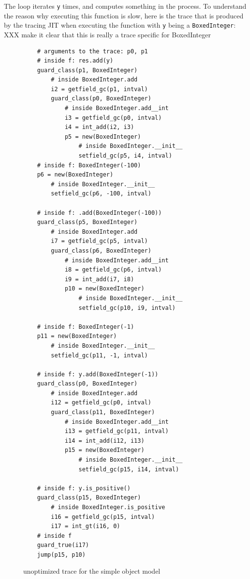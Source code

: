 \documentclass{sigplanconf}
\begin{document}
The loop iterates \texttt{y} times, and computes something in the process. To
understand the reason why executing this function is slow, here is the trace
that is produced by the tracing JIT when executing the function with \texttt{y}
being a \texttt{BoxedInteger}: XXX make it clear that this is really a trace specific for BoxedInteger

\begin{figure}
\begin{verbatim}
    # arguments to the trace: p0, p1
    # inside f: res.add(y)
    guard_class(p1, BoxedInteger)
        # inside BoxedInteger.add
        i2 = getfield_gc(p1, intval)
        guard_class(p0, BoxedInteger)
            # inside BoxedInteger.add__int
            i3 = getfield_gc(p0, intval)
            i4 = int_add(i2, i3)
            p5 = new(BoxedInteger)
                # inside BoxedInteger.__init__
                setfield_gc(p5, i4, intval)
    # inside f: BoxedInteger(-100) 
    p6 = new(BoxedInteger)
        # inside BoxedInteger.__init__
        setfield_gc(p6, -100, intval)

    # inside f: .add(BoxedInteger(-100))
    guard_class(p5, BoxedInteger)
        # inside BoxedInteger.add
        i7 = getfield_gc(p5, intval)
        guard_class(p6, BoxedInteger)
            # inside BoxedInteger.add__int
            i8 = getfield_gc(p6, intval)
            i9 = int_add(i7, i8)
            p10 = new(BoxedInteger)
                # inside BoxedInteger.__init__
                setfield_gc(p10, i9, intval)

    # inside f: BoxedInteger(-1)
    p11 = new(BoxedInteger)
        # inside BoxedInteger.__init__
        setfield_gc(p11, -1, intval)

    # inside f: y.add(BoxedInteger(-1))
    guard_class(p0, BoxedInteger)
        # inside BoxedInteger.add
        i12 = getfield_gc(p0, intval)
        guard_class(p11, BoxedInteger)
            # inside BoxedInteger.add__int
            i13 = getfield_gc(p11, intval)
            i14 = int_add(i12, i13)
            p15 = new(BoxedInteger)
                # inside BoxedInteger.__init__
                setfield_gc(p15, i14, intval)

    # inside f: y.is_positive()
    guard_class(p15, BoxedInteger)
        # inside BoxedInteger.is_positive
        i16 = getfield_gc(p15, intval)
        i17 = int_gt(i16, 0)
    # inside f
    guard_true(i17)
    jump(p15, p10)
\end{verbatim}
\caption{unoptimized trace for the simple object model}
\end{figure}
\end{document}
